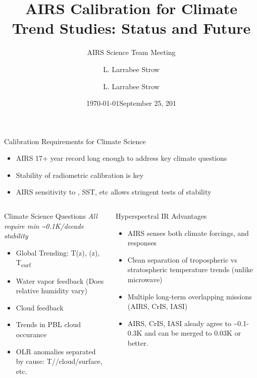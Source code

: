 \documentclass[10pt,t]{beamer}
\author{L. Larrabee Strow}
\date{\today}
\title{\large AIRS Calibration for Climate Trend Studies: Status and Future}
\subtitle{\footnotesize{AIRS Science Team Meeting}}
\date{\vspace{0.1in}\footnotesize{September 25, 201\vfill}}
\author{L. Larrabee Strow\inst{1,2}}
\institute[UMBC]{\inst{1} UMBC Physics Dept. \and \inst{2}UMBC JCET}
\begin{document}
\maketitle
{}


\begin{frame}[label={sec:org123901d},shrink=30]{Calibration Requirements for Climate Science}
\vspace{-0.1in}
\begin{large}
\begin{itemize}
\item AIRS 17+ year record long enough to address key climate questions
\item Stability of radiometric calibration is key
\item AIRS sensitivity to \cd, SST, etc allows stringent tests of stability
\end{itemize}
\end{large}
\vspace{-0.2in}
\begin{columns}
\begin{column}{0.55\columnwidth}
\begin{block}{Climate Science Questions}
\vspace{0.05in}
\emph{All require min \textasciitilde{}0.1K/decade stability}
\vspace{-0.05in}
\begin{itemize}
\item Global Trending: T(z), \water(z), T\textsubscript{surf}
\item Water vapor feedback (Does relative humidity vary)
\item Cloud feedback
\item Trends in PBL cloud occurance
\item OLR anomalies separated by cause: T/\water/cloud/surface, etc.
\end{itemize}
\end{block}
\end{column}

\begin{column}{0.55\columnwidth}
\begin{block}{Hyperspectral IR Advantages}
\begin{itemize}
\item AIRS senses both climate forcings, and responses
\item Clean separation of tropospheric vs stratospheric temperature trends (unlike microwave)
\item Multiple long-term overlapping missions (AIRS, CrIS, IASI)
\item AIRS, CrIS, IASI aleady agree to \textasciitilde{}0.1-0.3K and can be merged to 0.03K or better.
\end{itemize}
\end{block}
\end{column}
\end{columns}




\end{frame}
\end{document}
